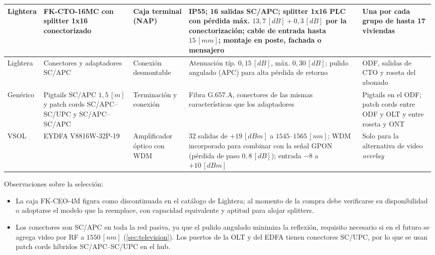 \begin{longtable}{|p{1.9cm}|p{2.4cm}|p{2.4cm}|p{4.4cm}|p{2.5cm}|}
    \hline
    Lightera \cite{et_cto, et_splitter} & FK-CTO-16MC con splitter 1x16 conectorizado & Caja terminal (NAP) & IP55; 16 salidas SC/APC; splitter 1x16 PLC con pérdida máx. $13{,}7 \, [dB] + 0{,}3 \, [dB]$ por la conectorización; cable de entrada hasta $15 \, [mm]$; montaje en poste, fachada o mensajero & Una por cada grupo de hasta 17 viviendas \\
    \hline
    Lightera \cite{et_splitter} & Conectores y adaptadores SC/APC & Conexión desmontable & Atenuación típ. $0{,}15 \, [dB]$, máx. $0{,}30 \, [dB]$; pulido angulado (APC) para alta pérdida de retorno & ODF, salidas de CTO y roseta del abonado \\
    \hline
    Genérico & Pigtails SC/APC $1{,}5 \, [m]$ y patch cords SC/APC--SC/UPC y SC/APC--SC/APC & Terminación y conexión & Fibra G.657.A, conectores de las mismas características que los adaptadores & Pigtails en el ODF; patch cords entre ODF y OLT y entre roseta y ONT \\
    \hline
    VSOL \cite{vsol_edfa} & EYDFA V8816W-32P-19 & Amplificador óptico con WDM & 32 salidas de $+19 \, [dBm]$ a $1545$--$1565 \, [nm]$; WDM incorporado para combinar con la señal GPON (pérdida de paso $0{,}8 \, [dB]$); entrada $-8$ a $+10 \, [dBm]$ & Solo para la alternativa de video \textit{overlay} \\
    \hline
\end{longtable}

Observaciones sobre la selección:
\begin{itemize}
    \item La caja FK-CEO-4M figura como discontinuada en el catálogo de Lightera; al momento de la compra debe verificarse su disponibilidad o adoptarse el modelo que la reemplace, con capacidad equivalente y aptitud para alojar splitters.
    \item Los conectores son SC/APC en toda la red pasiva, ya que el pulido angulado minimiza la reflexión, requisito necesario si en el futuro se agrega video por RF a $1550 \, [nm]$ (\autoref{sec:television}). Los puertos de la OLT y del EDFA tienen conectores SC/UPC, por lo que se usan patch cords híbridos SC/APC--SC/UPC en el hub.
\end{itemize}
